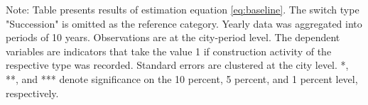 \begin{table}[htbp]
\begin{tabular}{lcccc}
      
   \end{tabular}
   
   \par \raggedright 
   Note: Table presents results of estimation equation \eqref{eq:baseline}. The switch type "Succession" is omitted as the  reference category. Yearly data was aggregated into periods of 10 years. Observations are at the city-period  level. The dependent variables are indicators that take the value 1 if  construction activity of the respective type was recorded. Standard errors are  clustered at the city level. *, **, and *** denote significance on the 10 percent, 5 percent, and 1 percent  level, respectively.
\end{table}
